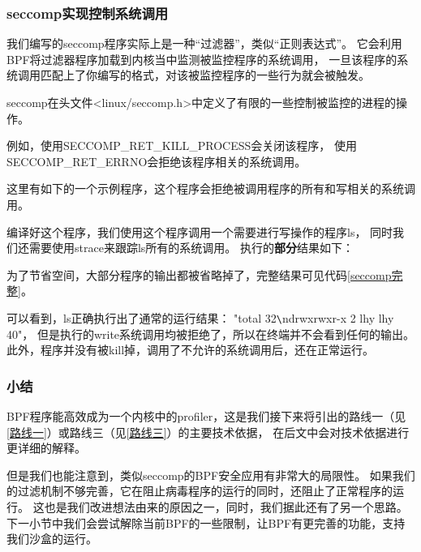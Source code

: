 \documentclass[AutoFakeBold,a4paper]{ctexart}
\begin{document}
\subsubsection{seccomp实现控制系统调用}

我们编写的seccomp程序实际上是一种“过滤器”，类似“正则表达式”。
它会利用BPF将过滤器程序加载到内核当中监测被监控程序的系统调用，
一旦该程序的系统调用匹配上了你编写的格式，对该被监控程序的一些行为就会被触发。

seccomp在头文件{\ttfamily <linux/seccomp.h>}中定义了有限的一些控制被监控的进程的操作。



例如，使用{\ttfamily SECCOMP\_RET\_KILL\_PROCESS}会关闭该程序，
使用{\ttfamily SECCOMP\_RET\_ERRNO}会拒绝该程序相关的系统调用。

这里有如下的一个示例程序，这个程序会拒绝被调用程序的所有和写相关的系统调用。



编译好这个程序，我们使用这个程序调用一个需要进行写操作的程序{\ttfamily ls}，
同时我们还需要使用{\ttfamily strace}来跟踪{\ttfamily ls}所有的系统调用。
执行的\textbf{部分}结果如下：



为了节省空间，大部分程序的输出都被省略掉了，完整结果可见代码\ref{seccomp完整}。

可以看到，{\ttfamily ls}正确执行出了通常的运行结果：
{\ttfamily "total 32\verb|\|ndrwxrwxr-x 2 lhy lhy 40"}，
但是执行的{\ttfamily write}系统调用均被拒绝了，所以在终端并不会看到任何的输出。
此外，程序并没有被kill掉，调用了不允许的系统调用后，还在正常运行。

\subsubsection{小结}

BPF程序能高效成为一个内核中的profiler，这是我们接下来将引出的路线一（见\ref{路线一}）或路线三（见\ref{路线三}）的主要技术依据，
在后文中会对技术依据进行更详细的解释。

但是我们也能注意到，类似seccomp的BPF安全应用有非常大的局限性。
如果我们的过滤机制不够完善，它在阻止病毒程序的运行的同时，还阻止了正常程序的运行。
这也是我们改进想法由来的原因之一，同时，我们据此还有了另一个思路。
下一小节中我们会尝试解除当前BPF的一些限制，让BPF有更完善的功能，支持我们沙盒的运行。
\end{document}
